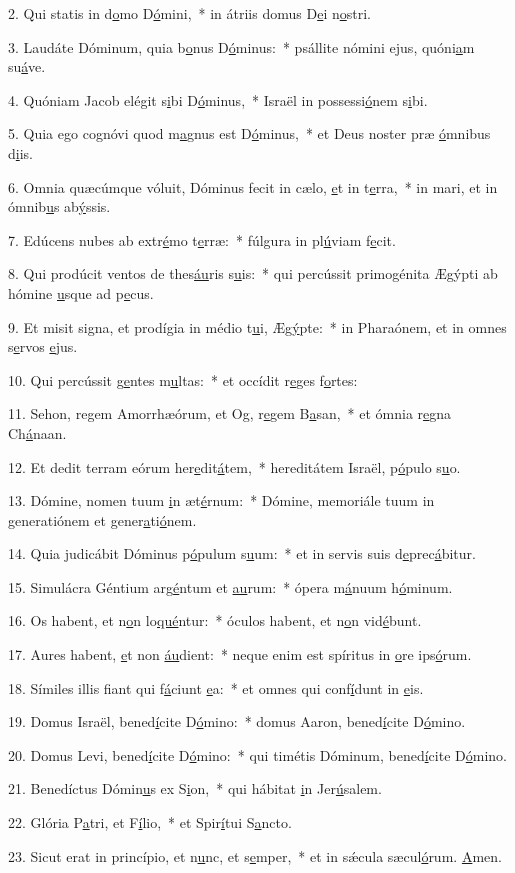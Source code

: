 2. Qui statis in d\uline{o}mo D\uline{ó}mini,~* in átriis domus D\uline{e}i n\uline{o}stri.\par 
3. Laudáte Dóminum, quia b\uline{o}nus D\uline{ó}minus:~* psállite nómini ejus, quóni\uline{a}m su\uline{á}ve.\par 
4. Quóniam Jacob elégit s\uline{i}bi D\uline{ó}minus,~* Israël in possessi\uline{ó}nem s\uline{i}bi.\par 
5. Quia ego cognóvi quod m\uline{a}gnus est D\uline{ó}minus,~* et Deus noster præ \uline{ó}mnibus d\uline{i}is.\par 
6. Omnia quæcúmque vóluit, Dóminus fecit in cælo, \uline{e}t in t\uline{e}rra,~* in mari, et in ómnib\uline{u}s ab\uline{ý}ssis.\par 
7. Edúcens nubes ab extr\uline{é}mo t\uline{e}rræ:~* fúlgura in pl\uline{ú}viam f\uline{e}cit.\par 
8. Qui prodúcit ventos de thes\uline{áu}ris s\uline{u}is:~* qui percússit primogénita Ægýpti ab hómine \uline{u}sque ad p\uline{e}cus.\par 
9. Et misit signa, et prodígia in médio t\uline{u}i, Æg\uline{ý}pte:~* in Pharaónem, et in omnes s\uline{e}rvos \uline{e}jus.\par 
10. Qui percússit g\uline{e}ntes m\uline{u}ltas:~* et occídit r\uline{e}ges f\uline{o}rtes:\par 
11. Sehon, regem Amorrhæórum, et Og, r\uline{e}gem B\uline{a}san,~* et ómnia r\uline{e}gna Ch\uline{á}naan.\par 
12. Et dedit terram eórum her\uline{e}dit\uline{á}tem,~* hereditátem Israël, p\uline{ó}pulo s\uline{u}o.\par 
13. Dómine, nomen tuum \uline{i}n æt\uline{é}rnum:~* Dómine, memoriále tuum in generatiónem et gener\uline{a}ti\uline{ó}nem.\par 
14. Quia judicábit Dóminus p\uline{ó}pulum s\uline{u}um:~* et in servis suis d\uline{e}prec\uline{á}bitur.\par 
15. Simulácra Géntium arg\uline{é}ntum et \uline{au}rum:~* ópera m\uline{á}nuum h\uline{ó}minum.\par 
16. Os habent, et n\uline{o}n lo\uline{qué}ntur:~* óculos habent, et n\uline{o}n vid\uline{é}bunt.\par 
17. Aures habent, \uline{e}t non \uline{áu}dient:~* neque enim est spíritus in \uline{o}re ips\uline{ó}rum.\par 
18. Símiles illis fiant qui f\uline{á}ciunt \uline{e}a:~* et omnes qui conf\uline{í}dunt in \uline{e}is.\par 
19. Domus Israël, bened\uline{í}cite D\uline{ó}mino:~* domus Aaron, bened\uline{í}cite D\uline{ó}mino.\par 
20. Domus Levi, bened\uline{í}cite D\uline{ó}mino:~* qui timétis Dóminum, bened\uline{í}cite D\uline{ó}mino.\par 
21. Benedíctus Dómin\uline{u}s ex S\uline{i}on,~* qui hábitat \uline{i}n Jer\uline{ú}salem.\par 
22. Glória P\uline{a}tri, et F\uline{í}lio,~* et Spir\uline{í}tui S\uline{a}ncto.\par 
23. Sicut erat in princípio, et n\uline{u}nc, et s\uline{e}mper,~* et in sǽcula sæcul\uline{ó}rum. \uline{A}men.\par 
